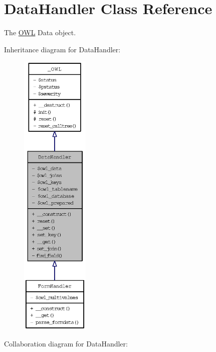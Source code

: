 \hypertarget{classDataHandler}{
\section{DataHandler Class Reference}
\label{classDataHandler}
}
The \hyperlink{classOWL}{OWL} Data object.  


Inheritance diagram for DataHandler:\nopagebreak
\begin{figure}[H]
\begin{center}
\leavevmode
\includegraphics[height=400pt]{classDataHandler__inherit__graph}
\end{center}
\end{figure}
Collaboration diagram for DataHandler:\nopagebreak
